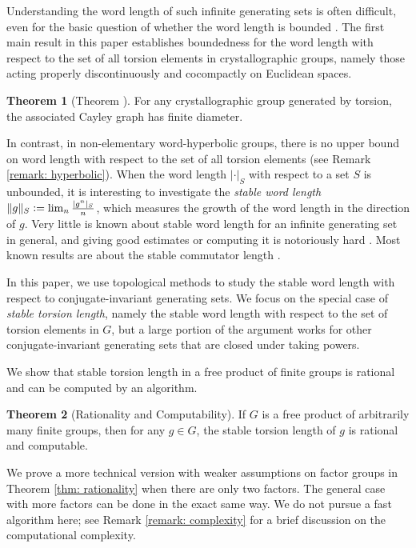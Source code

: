 \documentclass{amsart}
\theoremstyle{definition}
\numberwithin{equation}{section}
\theoremstyle{theorem}
\newtheorem{theoremA}{Theorem}
\theoremstyle{remark}
\def\defeq{\vcentcolon=}
\begin{document}
	Understanding the word length of such infinite generating sets is often difficult, even for the basic question of whether the word length is bounded \cite{Cal:surface,MargalitPutman,BM}. 
	The first main result in this paper establishes boundedness for the word length with respect to the set of all torsion elements in crystallographic groups, namely those acting properly discontinuously and cocompactly on Euclidean spaces.
	
	\begin{theoremA}[Theorem \protect{\ref{thm: vanishing}}]\label{introthm: vanishing}
	    For any crystallographic group generated by torsion, the associated Cayley graph has finite diameter.
	\end{theoremA}
	
	In contrast, in non-elementary word-hyperbolic groups, there is no upper bound on word length with respect to the set of all torsion elements (see Remark \ref{remark: hyperbolic}). When the word length $|\cdot|_S$ with respect to a set $S$ is unbounded, it is interesting to investigate the \emph{stable word length} $\|g\|_S\defeq \lim_n \frac{|g^n|_S}{n}$, which measures the growth of the word length in the direction of $g$. Very little is known about stable word length for an infinite generating set in general, and giving good estimates or computing it is notoriously hard \cite{Cal:surface}. Most known results are about the stable commutator length \cite{Cal:rational,CF:sclhyp,Chen:sclBS}.
	
	In this paper, we use topological methods to study the stable word length with respect to conjugate-invariant generating sets. We focus on the special case of \emph{stable torsion length}, namely the stable word length with respect to the set of torsion elements in $G$, but a large portion of the argument works for other conjugate-invariant generating sets that are closed under taking powers. %
	
	We show that stable torsion length in a free product of finite groups is rational and can be computed by an algorithm.
	\begin{theoremA}[Rationality and Computability]\label{introthm: rationality}
	    If $G$ is a free product of arbitrarily many finite groups, then for any $g\in G$, the stable torsion length of $g$ is rational and computable.
	\end{theoremA}
	We prove a more technical version with weaker assumptions on factor groups in Theorem \ref{thm: rationality} when there are only two factors. The general case with more factors can be done in the exact same way. We do not pursue a fast algorithm here; see Remark \ref{remark: complexity} for a brief discussion on the computational complexity.
	
\end{document}
